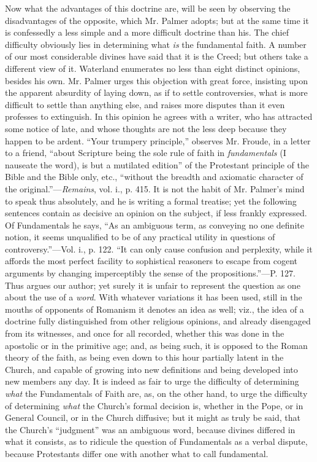 Now what the advantages of this doctrine are,
will be seen by observing the disadvantages of the opposite, which Mr.
Palmer adopts; but at the same time it is confessedly a less simple
and a more difficult doctrine than his. The chief difficulty obviously
lies in determining what \emph{is} the fundamental faith. A number of our
most considerable divines have said that it is the Creed; but others
take a different view of it. Waterland enumerates no less than eight
distinct opinions, besides his own. Mr. Palmer urges this objection
with great force, insisting upon the apparent absurdity of laying
down, as if to settle controversies, what is more difficult to settle
than anything else, and raises more disputes than it even professes to
extinguish. In this opinion he agrees with a writer, who has attracted
some notice of late, and whose thoughts are not the less deep because
they happen to be ardent. ``Your trumpery principle,'' observes Mr.
Froude, in a letter to a friend, ``about Scripture being the sole rule
of faith in \emph{fundamentals} (I nauseate the word), is but a
mutilated edition'' of the Protestant principle of the Bible and the
Bible only, etc., ``without the breadth and axiomatic character of the
original.''—\emph{Remains}, vol. i., p. 415. It is not the habit of
Mr. Palmer's mind to speak thus absolutely, and he is writing a formal
treatise; yet the following sentences contain as decisive an opinion
on the subject, if less frankly expressed. Of Fundamentals he says, ``As
an ambiguous term, as conveying no one definite notion, it seems
unqualified to be of any practical utility in questions of
controversy.''—Vol. i., p. 122. ``It can only cause confusion and
perplexity, while it affords the most perfect facility to sophistical
reasoners to escape from cogent arguments by changing imperceptibly
the sense of the propositions.''—P. 127. Thus argues our author; yet
surely it is unfair to represent the question as one about the use of
a \emph{word}. With whatever variations it has been used, still in the
mouths of opponents of Romanism it denotes an idea as well; viz., the
idea of a doctrine fully distinguished from other religious opinions,
and already disengaged from its witnesses, and once for all recorded,
whether this was done in the apostolic or in the primitive age; and,
as being such, it is opposed to the Roman theory of the faith, as
being even down to this hour partially latent in the Church, and
capable of growing into new definitions and being developed into new
members any day. It is indeed as fair to urge the difficulty of
determining \emph{what} the Fundamentals of Faith are, as, on the
other hand, to urge the difficulty of determining \emph{what} the
Church's formal decision is, whether in the Pope, or in General
Council, or in the Church diffusive; but it might as truly be said,
that the Church's ``judgment'' was an ambiguous word, because divines
differed in what it consists, as to ridicule the question of
Fundamentals as a verbal dispute, because Protestants differ one with
another what to call fundamental.

